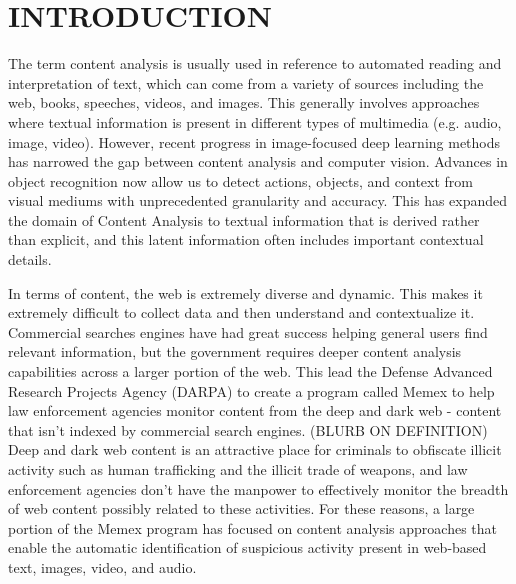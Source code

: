 \section{INTRODUCTION}


The term content analysis is usually used in reference to automated reading and interpretation of text, which can come from a variety of sources including the web, books, speeches, videos, and images. This generally involves approaches where textual information is present in different types of multimedia (e.g. audio, image, video). However, recent progress in image-focused deep learning methods has narrowed the gap between content analysis and computer vision. Advances in object recognition now allow us to detect actions, objects, and context from visual mediums with unprecedented granularity and accuracy. This has expanded the domain of Content Analysis to textual information that is derived rather than explicit, and this latent information often includes important contextual details. 

In terms of content, the web is extremely diverse and dynamic. This makes it extremely difficult to collect data and then understand and contextualize it. Commercial searches engines have had great success helping general users find relevant information, but the government requires deeper content analysis capabilities across a larger portion of the web. This lead the Defense Advanced Research Projects Agency (DARPA) to create a program called Memex \cite{fbo-memex} to help law enforcement agencies monitor content from the deep and dark web - content that isn't indexed by commercial search engines. (BLURB ON DEFINITION) Deep and dark web content is an attractive place for criminals to obfiscate illicit activity such as human trafficking and the illicit trade of weapons, and law enforcement agencies don't have the manpower to effectively monitor the breadth of web content possibly related to these activities. For these reasons, a large portion of the Memex program has focused on content analysis approaches that enable the automatic identification of suspicious activity present in web-based text, images, video, and audio.

